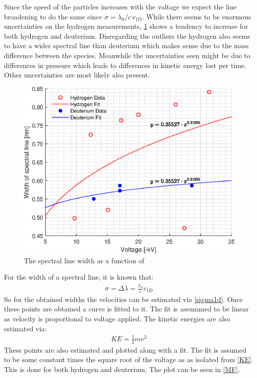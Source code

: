 Since the speed of the particles increases with the voltage we expect the line broadening to do the same since $\sigma=\lambda_{0}/c\, v_{\mathrm{1D}}$. While there seems to be enormous uncertainties on the hydrogen measurements, \cref{Vsigma} shows a tendency to increase for both hydrogen and deuterium. Disregarding the outliers the hydrogen also seems to have a wider spectral line than deuterium which makes sense due to the mass difference between the species. Meanwhile the uncertainties seen might be due to differences in pressure which leads to differences in kinetic energy lost per time. Other uncertainties are most likely also present.
\begin{figure}
    \centering
    \includegraphics[width=.7\textwidth]{MatlabFigures/Asign3/VSigma.eps}
    \caption{The spectral line width as a function of }
    \label{Vsigma}
\end{figure}
For the width of a spectral line, it is known that:
\begin{align}
    \sigma = \Delta\lambda = \frac{\lambda_0}{c} v_{\mathrm{1D}}\label{sigma1d}
\end{align}
So for the obtained widths the velocities can be estimated via \cref{sigma1d}. Once these points are obtained a curve is fitted to it. The fit is assummed to be linear as velocity is proportional to voltage applied. The kinetic energies are also estimated via:
\begin{align}
    KE = \frac{1}{2}mv^2\label{KE}
\end{align}
These points are also estimated and plotted along with a fit. The fit is assumed to be some constant times the square root of the voltage as as isolated from \cref{KE}. This is done for both hydrogen and deuterium. The plot can be seen in \cref{MF}.
